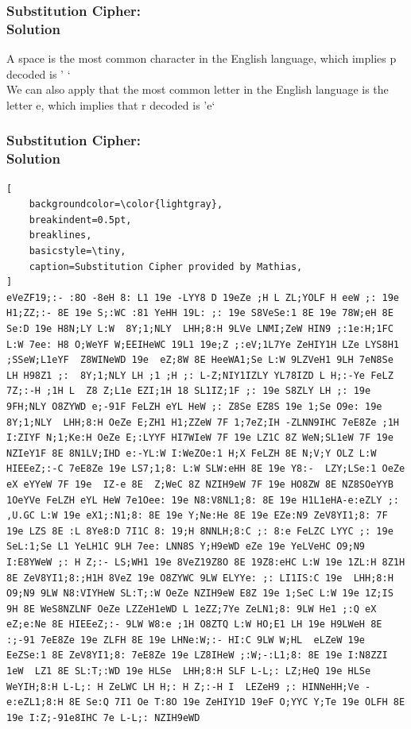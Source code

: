 \documentclass{uva-inf-presentation}
\begin{document}
\begin{frame}
\frametitle{Substitution Cipher:\\ Solution}
A space is the most common character in the English language,
which implies p decoded is ' `\\

We can also apply that the most common letter in the English language is the
letter e, which implies that r decoded is 'e`
\end{frame}

\begin{frame}[containsverbatim]
\frametitle{Substitution Cipher:\\ Solution}
\vspace{-20pt}
\begin{lstlisting}[
    backgroundcolor=\color{lightgray},
    breakindent=0.5pt,
    breaklines,
    basicstyle=\tiny,
    caption=Substitution Cipher provided by Mathias,
]
eVeZF19;:- :8O -8eH 8: L1 19e -LYY8 D 19eZe ;H L ZL;YOLF H eeW ;: 19e H1;ZZ;:- 8E 19e S;:WC :81 YeHH 19L: ;: 19e S8VeSe:1 8E 19e 78W;eH 8E Se:D 19e H8N;LY L:W  8Y;1;NLY  LHH;8:H 9LVe LNMI;ZeW HIN9 ;:1e:H;1FC L:W 7ee: H8 O;WeYF W;EEIHeWC 19L1 19e;Z ;:eV;1L7Ye ZeHIY1H LZe LYS8H1 ;SSeW;L1eYF  Z8WINeWD 19e  eZ;8W 8E HeeWA1;Se L:W 9LZVeH1 9LH 7eN8Se LH H98Z1 ;:  8Y;1;NLY LH ;1 ;H ;: L-Z;NIY1IZLY YL78IZD L H;:-Ye FeLZ 7Z;:-H ;1H L  Z8 Z;L1e EZI;1H 18 SL1IZ;1F ;: 19e S8ZLY LH ;: 19e  9FH;NLY O8ZYWD e;-91F FeLZH eYL HeW ;: Z8Se EZ8S 19e 1;Se O9e: 19e  8Y;1;NLY  LHH;8:H OeZe E;ZH1 H1;ZZeW 7F 1;7eZ;IH -ZLNN9IHC 7eE8Ze ;1H I:ZIYF N;1;Ke:H OeZe E;:LYYF HI7WIeW 7F 19e LZ1C 8Z WeN;SL1eW 7F 19e NZIeY1F 8E 8N1LV;IHD e:-YL:W I:WeZOe:1 H;X FeLZH 8E N;V;Y OLZ L:W HIEEeZ;:-C 7eE8Ze 19e LS7;1;8: L:W SLW:eHH 8E 19e Y8:-  LZY;LSe:1 OeZe eX eYYeW 7F 19e  IZ-e 8E  Z;WeC 8Z NZIH9eW 7F 19e HO8ZW 8E NZ8SOeYYB 1OeYVe FeLZH eYL HeW 7e1Oee: 19e N8:V8NL1;8: 8E 19e H1L1eHA-e:eZLY ;: ,U.GC L:W 19e eX1;:N1;8: 8E 19e Y;Ne:He 8E 19e EZe:N9 ZeV8YI1;8: 7F 19e LZS 8E :L 8Ye8:D 7I1C 8: 19;H 8NNLH;8:C ;: 8:e FeLZC LYYC ;: 19e SeL:1;Se L1 YeLH1C 9LH 7ee: LNN8S Y;H9eWD eZe 19e YeLVeHC O9;N9 I:E8YWeW ;: H Z;:- LS;WH1 19e 8VeZ19Z8O 8E 19Z8:eHC L:W 19e 1ZL:H 8Z1H 8E ZeV8YI1;8:;H1H 8VeZ 19e O8ZYWC 9LW ELYYe: ;: LI1IS:C 19e  LHH;8:H O9;N9 9LW N8:VIYHeW SL:T;:W OeZe NZIH9eW E8Z 19e 1;SeC L:W 19e 1Z;IS 9H 8E WeS8NZLNF OeZe LZZeH1eWD L 1eZZ;7Ye ZeLN1;8: 9LW He1 ;:Q eX eZ;e:Ne 8E HIEEeZ;:- 9LW W8:e ;1H O8ZTQ L:W HO;E1 LH 19e H9LWeH 8E :;-91 7eE8Ze 19e ZLFH 8E 19e LHNe:W;:- HI:C 9LW W;HL  eLZeW 19e EeZSe:1 8E ZeV8YI1;8: 7eE8Ze 19e LZ8IHeW ;:W;-:L1;8: 8E 19e I:N8ZZI 1eW  LZ1 8E SL:T;:WD 19e HLSe  LHH;8:H SLF L-L;: LZ;HeQ 19e HLSe WeYIH;8:H L-L;: H ZeLWC LH H;: H Z;:-H I  LEZeH9 ;: HINNeHH;Ve -e:eZL1;8:H 8E Se:Q 7I1 Oe T:8O 19e ZeHIY1D 19eF O;YYC Y;Te 19e OLFH 8E 19e I:Z;-91e8IHC 7e L-L;: NZIH9eWD
\end{lstlisting}
\end{frame}
\end{document}
